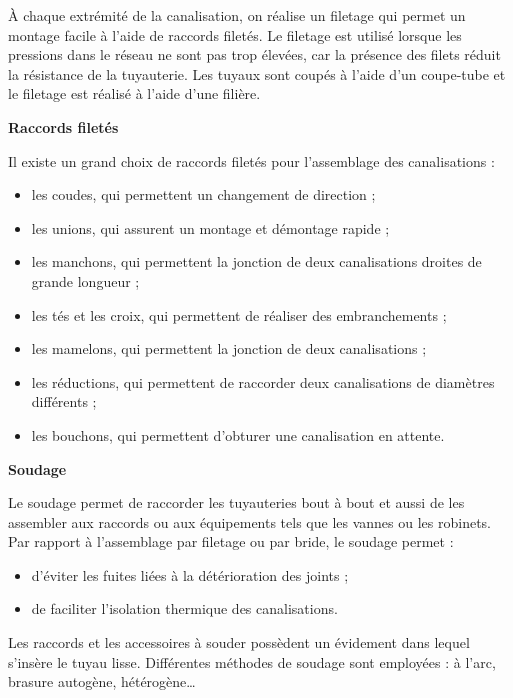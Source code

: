 À chaque extrémité de la canalisation, on réalise un filetage qui permet un montage facile à l’aide de raccords filetés. Le filetage est utilisé lorsque les pressions dans le réseau ne sont pas trop élevées, car la présence des filets réduit la résistance de la tuyauterie.
Les tuyaux sont coupés à l’aide d’un coupe-tube et le filetage est réalisé à l’aide d’une 
filière.


\vspace{0.3cm}
\textbf{Raccords filetés}
\vspace{0.3cm}

Il existe un grand choix de raccords filetés pour l’assemblage des canalisations :
\begin{itemize}
\item  les coudes, qui permettent un changement de direction ;
\item  les unions, qui assurent un montage et démontage rapide ;
\item  les manchons, qui permettent la jonction de deux canalisations droites de grande longueur ;
\item  les tés et les croix, qui permettent de réaliser des embranchements ;
\item  les mamelons, qui permettent la jonction de deux canalisations ;
\item  les réductions, qui permettent de raccorder deux canalisations de diamètres différents ;
\item  les bouchons, qui permettent d’obturer une canalisation en attente.

\end{itemize}

\vspace{0.3cm}
\textbf{Soudage}
\vspace{0.3cm} 

Le soudage permet de raccorder les tuyauteries bout à bout et aussi de les assembler aux raccords ou aux équipements tels que les vannes ou les robinets.
Par rapport à l’assemblage par filetage ou par bride, le soudage permet :

\begin{itemize}

\item  d’éviter les fuites liées à la détérioration des joints ;
\item  de faciliter l’isolation thermique des canalisations.

 \end{itemize}

Les raccords et les accessoires à souder possèdent un évidement dans lequel s’insère le tuyau lisse. Différentes méthodes de soudage sont employées : à l’arc, brasure autogène, hétérogène…


